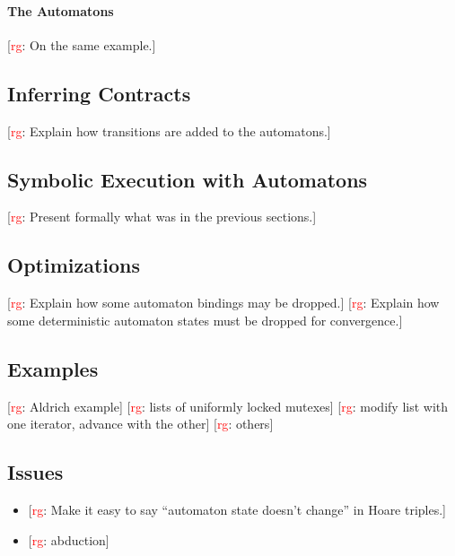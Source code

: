 \documentclass[a4paper]{article}
\newcommand{\todo}[2]{{\small [\textcolor{red}{#1}: #2]}}
\newcommand{\rg}[1]{\todo{rg}{#1}}
\theoremstyle{remark}
\begin{document}
\paragraph{The Automatons} %

\rg{On the same example.}

\subsection{Inferring Contracts}\label{sec:infer} %

\rg{Explain how transitions are added to the automatons.}

\subsection{Symbolic Execution with Automatons}\label{sec:formal} %

\rg{Present formally what was in the previous sections.}

\subsection{Optimizations}\label{sec:optimizations} %

\rg{Explain how some automaton bindings may be dropped.}
\rg{Explain how some deterministic automaton states must be dropped for convergence.}

\subsection{Examples}\label{sec:example} %

\rg{Aldrich example}
\rg{lists of uniformly locked mutexes}
\rg{modify list with one iterator, advance with the other}
\rg{others}

\subsection{Issues}\label{sec:issues} %

\begin{itemize}
\item \rg{Make it easy to say ``automaton state doesn't change'' in Hoare triples.}
\item \rg{abduction}
\end{itemize}



\end{document}
